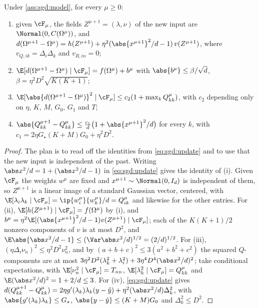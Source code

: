\begin{refsection}
\begin{lemma}\label{lem:sgd:step}
Under \cref{ass:sgd:model}, for every $\mu\ge0$:
\begin{enumerate}
\item given $\cF_\mu$, the fields $Z^{\mu+1}=(\lambda,\nu)$ of the new input are $\Normal(0,C(\Omega^\mu))$, and $d(\Omega^{\mu+1}-\Omega^\mu)=h(Z^{\mu+1})+\eta^2(\abs{x^{\mu+1}}^2/d-1)\,v(Z^{\mu+1})$, where $v_{Q,ik}=\Delta_i\Delta_k$ and $v_{R,in}=0$;
\item $\E[d(\Omega^{\mu+1}-\Omega^\mu)\mid\cF_\mu]=f(\Omega^\mu)+b^\mu$ with $\abs{b^\mu}\le\beta/\sqrt d$, $\beta=\eta^2D^2\sqrt{K(K+1)}$;
\item $\E[\abs{d(\Omega^{\mu+1}-\Omega^\mu)}^2\mid\cF_\mu]\le c_2(1+\max_kQ^\mu_{kk})$, with $c_2$ depending only on $\eta$, $K$, $M$, $G_0$, $G_1$ and $T$;
\item $\abs{Q^{\mu+1}_{kk}-Q^\mu_{kk}}\le\frac{c_1}d\bigl(1+\abs{x^{\mu+1}}^2/d\bigr)$ for every $k$, with $c_1=2\eta G_\star(K+M)G_0+\eta^2D^2$.
\end{enumerate}
\end{lemma}

\begin{proof}
The plan is to read off the identities from \eqref{eq:sgd:update} and to use that the new input is independent of the past. Writing $\abs x^2/d=1+(\abs x^2/d-1)$ in \eqref{eq:sgd:update} gives the identity of (i). Given $\cF_\mu$ the weights $w^\mu$ are fixed and $x^{\mu+1}\sim\Normal(0,I_d)$ is independent of them, so $Z^{\mu+1}$ is a linear image of a standard Gaussian vector, centered, with $\E[\lambda_i\lambda_k\mid\cF_\mu]=\ip{w_i^\mu}{w_k^\mu}/d=Q^\mu_{ik}$ and likewise for the other entries. For (ii), $\E[h(Z^{\mu+1})\mid\cF_\mu]=f(\Omega^\mu)$ by (i), and $b^\mu=\eta^2\E[(\abs{x^{\mu+1}}^2/d-1)v(Z^{\mu+1})\mid\cF_\mu]$; each of the $K(K+1)/2$ nonzero components of $v$ is at most $D^2$, and $\E\abs{\abs x^2/d-1}\le(\Var\abs x^2/d)^{1/2}=(2/d)^{1/2}$. For (iii), $(\eta\Delta_i\nu_n)^2\le\eta^2D^2\nu_n^2$, and by $(a+b+c)^2\le3(a^2+b^2+c^2)$ the squared $Q$-components are at most $3\eta^2D^2(\lambda_k^2+\lambda_i^2)+3\eta^4D^4(\abs x^2/d)^2$; take conditional expectations, with $\E[\nu_n^2\mid\cF_\mu]=T_{nn}$, $\E[\lambda_k^2\mid\cF_\mu]=Q^\mu_{kk}$ and $\E(\abs x^2/d)^2=1+2/d\le3$. For (iv), \eqref{eq:sgd:update} gives $d(Q^{\mu+1}_{kk}-Q^\mu_{kk})=2\eta g'(\lambda_k)\lambda_k(y-\hat y)+\eta^2(\abs x^2/d)\Delta_k^2$, with $\abs{g'(\lambda_k)\lambda_k}\le G_\star$, $\abs{y-\hat y}\le(K+M)G_0$ and $\Delta_k^2\le D^2$.
\end{proof}


\end{refsection}
